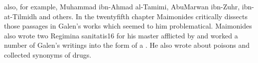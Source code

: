 \documentclass[twoside]{book}
\begin{document}
        \beginnumbering
		  \pstart
		  also, for example, Muhammad ibn-Ahmad al-Tamimi, AbuMarwan ibn-Zuhr, ibn-at-Tilmidh and others. In the twentyfifth chapter Maimonides critically dissects those passages in Galen's works which seemed to him problematical. Maimonides also wrote two Regimina sanitatis16 for his master afflicted by  and worked a number of Galen's writings into the form of a . He also wrote about poisons and collected synonyms of drugs.
		  \pend
                    \endnumbering
\end{document}
